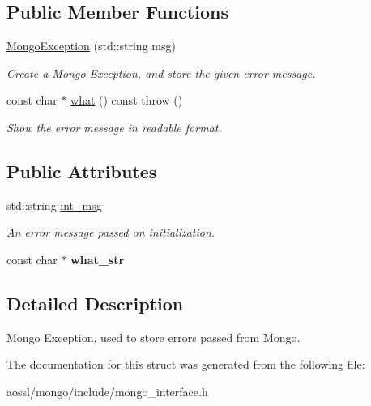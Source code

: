 \subsection*{Public Member Functions}
\begin{DoxyCompactItemize}
\item 
\hyperlink{structMongoException_addaa545189ab30bcc6a0e957514253fa}{Mongo\+Exception} (std\+::string msg)\hypertarget{structMongoException_addaa545189ab30bcc6a0e957514253fa}{}\label{structMongoException_addaa545189ab30bcc6a0e957514253fa}

\begin{DoxyCompactList}\small\item\em Create a Mongo Exception, and store the given error message. \end{DoxyCompactList}\item 
const char $\ast$ \hyperlink{structMongoException_a5202b0dfc3d8a554d9f36e4b1c31c2a3}{what} () const   throw ()\hypertarget{structMongoException_a5202b0dfc3d8a554d9f36e4b1c31c2a3}{}\label{structMongoException_a5202b0dfc3d8a554d9f36e4b1c31c2a3}

\begin{DoxyCompactList}\small\item\em Show the error message in readable format. \end{DoxyCompactList}\end{DoxyCompactItemize}
\subsection*{Public Attributes}
\begin{DoxyCompactItemize}
\item 
std\+::string \hyperlink{structMongoException_ae5a0824b7a469b66dcc3947704310e4c}{int\+\_\+msg}\hypertarget{structMongoException_ae5a0824b7a469b66dcc3947704310e4c}{}\label{structMongoException_ae5a0824b7a469b66dcc3947704310e4c}

\begin{DoxyCompactList}\small\item\em An error message passed on initialization. \end{DoxyCompactList}\item 
const char $\ast$ {\bfseries what\+\_\+str}\hypertarget{structMongoException_a353b1718c8c33c8216cafcfeb596859f}{}\label{structMongoException_a353b1718c8c33c8216cafcfeb596859f}

\end{DoxyCompactItemize}


\subsection{Detailed Description}
Mongo Exception, used to store errors passed from Mongo. 

The documentation for this struct was generated from the following file\+:\begin{DoxyCompactItemize}
\item 
aossl/mongo/include/mongo\+\_\+interface.\+h\end{DoxyCompactItemize}
